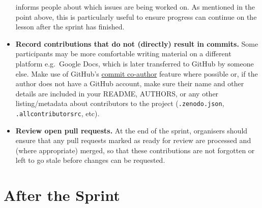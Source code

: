 \documentclass[
]{book}
\begin{document}
\begin{itemize}
  informs people about which issues are being worked on.
  As mentioned in the point above, this is particularly useful to ensure progress
  can continue on the lesson after the sprint has finished.
\item
  \textbf{Record contributions that do not (directly) result in commits.}
  Some participants may be more comfortable writing material on a different platform
  e.g.~Google Docs, which is later transferred to GitHub by someone else.
  Make use of GitHub's \href{https://github.blog/2018-01-29-commit-together-with-co-authors/}{commit co-author} feature where possible or,
  if the author does not have a GitHub account,
  make sure their name and other details are included in your README, AUTHORS,
  or any other listing/metadata about contributors to the project
  (\texttt{.zenodo.json}, \texttt{.allcontributorsrc}, etc).
\item
  \textbf{Review open pull requests.}
  At the end of the sprint, organisers should ensure that any pull requests marked as ready for review are processed and (where appropriate) merged,
  so that these contributions are not forgotten or left to go stale before changes can be requested.
\end{itemize}

\hypertarget{after-the-sprint}{%
\section{After the Sprint}\label{after-the-sprint}}
\end{document}
